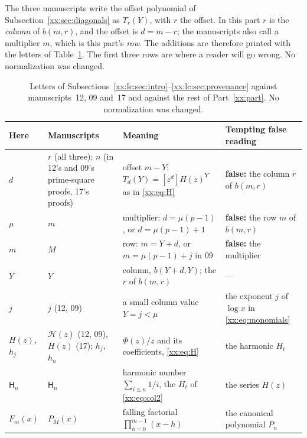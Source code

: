 \documentclass[11pt,a4paper]{article}
\numberwithin{equation}{section}
\theoremstyle{definition}
\theoremstyle{remark}
\theoremstyle{plain}
\newcommand{\coef}[2]{[#1^{#2}]}
\begin{document}
The three manuscripts write the offset polynomial of
Subsection~\ref{xx:sec:diagonals} as $T_r(Y)$, with $r$ the offset.  In this
part $r$ is the \emph{column} of $b(m,r)$, and the offset is $d=m-r$; the
manuscripts also call a multiplier $m$, which is this part's \emph{row}.  The
additions are therefore printed with the letters of
Table~\ref{xx:lc:tab:notation}.  The first three rows are where a reader will
go wrong.  No normalization was changed.

\begingroup
\renewcommand{\thetable}{\thesection.A}%
\renewcommand{\theHtable}{xx.lc.\thesection.A}%
\begin{table}[!htbp]
\centering\small
\caption{Letters of Subsections~\ref{xx:lc:sec:intro}--\ref{xx:lc:sec:provenance}
against manuscripts~12, 09 and~17 and against the rest of Part~\ref{xx:part}.
No normalization was changed.}\label{xx:lc:tab:notation}
\begin{tabular}{@{}>{\raggedright\arraybackslash}p{}
 >{\raggedright\arraybackslash}p{}
 >{\raggedright\arraybackslash}p{}
 >{\raggedright\arraybackslash}p{}@{}}
\toprule
Here & Manuscripts & Meaning & Tempting false reading\\
\midrule
$d$ & $r$ (all three); $n$ (in 12's and 09's prime-square proofs, 17's proofs) & offset $m-Y$; $T_d(Y)=\coef{z}{d}H(z)^Y$ as in \eqref{xx:eq:H} &
 \textbf{false:} the column $r$ of $b(m,r)$\\
$\mu$ & $m$ & multiplier: $d=\mu(p-1)$, or $d=\mu(p-1)+1$ &
 \textbf{false:} the row $m$ of $b(m,r)$\\
$m$ & $M$ & row: $m=Y+d$, or $m=\mu(p-1)+j$ in 09 & \textbf{false:} the multiplier\\
\midrule
$Y$ & $Y$ & column, $b(Y+d,Y)$; the $r$ of $b(m,r)$ & ---\\
$j$ & $j$ (12, 09) & a small column value $Y=j<\mu$ &
 the exponent $j$ of $\log x$ in \eqref{xx:eq:monomials}\\
$H(z)$, $h_j$ & $\mathcal H(z)$ (12, 09), $H(z)$ (17); $h_j$, $h_n$ &
 $\Phi(z)/z$ and its coefficients, \eqref{xx:eq:H} & the harmonic $H_t$\\
$\mathsf H_n$ & $\mathsf H_n$ & harmonic number $\sum_{i\le n}1/i$, the $H_t$ of \eqref{xx:eq:col2} & the series $H(z)$\\
$F_m(x)$ & $P_M(x)$ & falling factorial $\prod_{h=0}^{m-1}(x-h)$ &
 the canonical polynomial $P_n$\\

\end{tabular}
\end{table}
\end{document}

